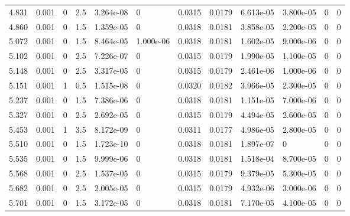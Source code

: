 \documentclass[preview]{standalone}
\begin{document}
{{{\begin{tabular}{L{1.2cm}C{1.2cm} C{0.3cm}C{0.5cm} C{1.4cm}C{1.4cm} C{1.4cm}C{1.4cm} C{1.6cm}C{1.6cm} C{1.6cm}C{1.6cm}}
  4.831  &  0.001  & 0     & 2.5 &  3.264e-08  & 0  &  0.0315&   0.0179& 6.613e-05 & 3.800e-05   &  0 & 0  \\ 
  4.860  &  0.001  & 0     & 1.5 &  1.359e-05  & 0  &  0.0318&   0.0181& 3.858e-05 & 2.200e-05   &  0 & 0  \\ 
  5.072  &  0.001  & 0     & 1.5 &  8.464e-05  & 1.000e-06  &  0.0318&   0.0181& 1.602e-05 & 9.000e-06   &  0 & 0  \\ 
  5.102  &  0.001  & 0     & 2.5 &  7.226e-07  & 0  &  0.0315&   0.0179& 1.990e-05 & 1.100e-05   &  0 & 0  \\ 
  5.148  &  0.001  & 0     & 2.5 &  3.317e-05  & 0  &  0.0315&   0.0179& 2.461e-06 & 1.000e-06   &  0 & 0  \\ 
  5.151  &  0.001  & 1     & 0.5 &  1.515e-08  & 0  &  0.0320&   0.0182& 3.966e-05 & 2.300e-05   &  0 & 0  \\ 
  5.237  &  0.001  & 0     & 1.5 &  7.386e-06  & 0  &  0.0318&   0.0181& 1.151e-05 & 7.000e-06   &  0 & 0  \\ 
  5.327  &  0.001  & 0     & 2.5 &  2.692e-05  & 0  &  0.0315&   0.0179& 4.494e-05 & 2.600e-05   &  0 & 0  \\ 
  5.453  &  0.001  & 1     & 3.5 &  8.172e-09  & 0  &  0.0311&   0.0177& 4.986e-05 & 2.800e-05   &  0 & 0  \\ 
  5.510  &  0.001  & 0     & 1.5 &  1.723e-10  & 0  &  0.0318&   0.0181& 1.897e-07 & 0   &  0 & 0  \\ 
  5.535  &  0.001  & 0     & 1.5 &  9.999e-06  & 0  &  0.0318&   0.0181& 1.518e-04 & 8.700e-05   &  0 & 0  \\ 
  5.568  &  0.001  & 0     & 2.5 &  1.537e-05  & 0  &  0.0315&   0.0179& 9.379e-05 & 5.300e-05   &  0 & 0  \\ 
  5.682  &  0.001  & 0     & 2.5 &  2.005e-05  & 0  &  0.0315&   0.0179& 4.932e-06 & 3.000e-06   &  0 & 0  \\ 
  5.701  &  0.001  & 0     & 1.5 &  3.172e-05  & 0  &  0.0318&   0.0181& 7.170e-05 & 4.100e-05   &  0 & 0  \\ 
\hline 
\end{tabular} 

}}}
\end{document}
